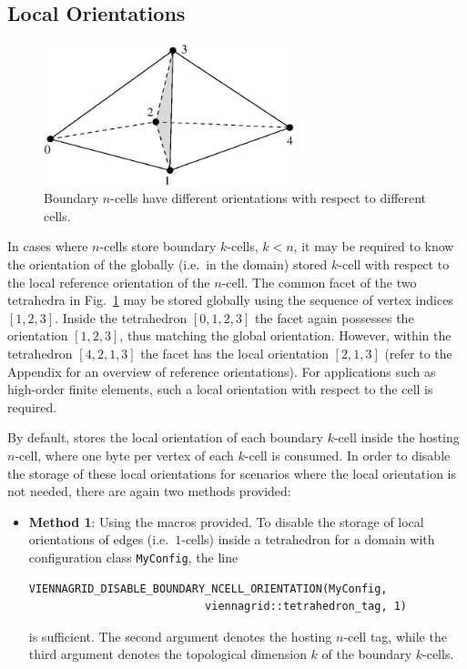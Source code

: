 \begin{itemize}
\subsection{Local Orientations} \label{subsec:customize-local-orientations}
\begin{figure}[tb]
\centering
 \includegraphics[width=0.65\textwidth]{figures/interface-tets.eps}
 \caption{Boundary $n$-cells have different orientations with respect to different cells.}
 \label{fig:orientation-boundary-ncells}
\end{figure}

In cases where $n$-cells store boundary $k$-cells, $k<n$, it may be required to know the orientation of the globally (i.e.~in the domain) stored $k$-cell with respect to the local reference orientation of the $n$-cell. The common facet of the two tetrahedra in Fig.~\ref{fig:orientation-boundary-ncells} may be stored globally using the sequence of vertex indices $[1, 2, 3]$. Inside the tetrahedron $[0, 1, 2, 3]$ the facet again possesses the orientation $[1, 2, 3]$, thus matching the global orientation. However, within the tetrahedron $[4, 2, 1, 3]$ the facet has the local orientation $[2, 1, 3]$ (refer to the Appendix for an overview of reference orientations). For applications such as high-order finite elements, such a local orientation with respect to the cell is required.


By default, {\ViennaGrid} stores the local orientation of each boundary $k$-cell inside the hosting $n$-cell, where one byte per vertex of each $k$-cell is consumed. In order to disable the storage of these local orientations for scenarios where the local orientation is not needed, there are again two methods provided:
\begin{itemize}
 \item \textbf{Method 1}: Using the macros provided. To disable the storage of local orientations of edges (i.e.~$1$-cells) inside a tetrahedron for a domain with configuration class \lstinline|MyConfig|, the line
\begin{lstlisting}
VIENNAGRID_DISABLE_BOUNDARY_NCELL_ORIENTATION(MyConfig,
                           viennagrid::tetrahedron_tag, 1) 
\end{lstlisting}
is sufficient. The second argument denotes the hosting $n$-cell tag, while the third argument denotes the topological dimension $k$ of the boundary $k$-cells.


\end{itemize}
\end{itemize}
